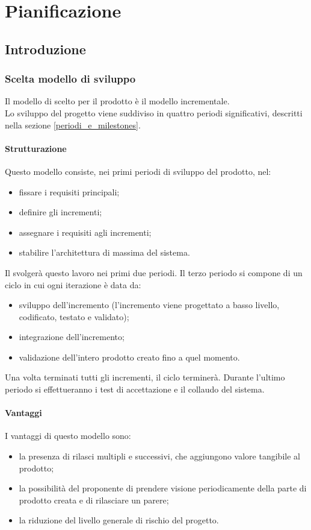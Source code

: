 \section {Pianificazione}
\subsection {Introduzione}
	\subsubsection{Scelta modello di sviluppo}
	Il modello di  scelto per il prodotto è il modello incrementale.\\
	Lo sviluppo del progetto viene suddiviso in quattro periodi significativi, descritti nella sezione \ref{periodi_e_milestones}.
	\paragraph{Strutturazione}
	Questo modello consiste, nei primi periodi di sviluppo del prodotto, nel:
	\begin{itemize}
			\item fissare i requisiti principali;
			\item definire gli incrementi;
			\item assegnare i requisiti agli incrementi;
			\item stabilire l'architettura di massima del sistema.
	\end{itemize}
	Il  svolgerà questo lavoro nei primi due periodi. Il terzo periodo si compone di un ciclo in cui ogni iterazione è data da:
	\begin{itemize}
		\item sviluppo dell'incremento (l'incremento viene progettato a basso livello, codificato, testato e validato);
		\item integrazione dell'incremento;
		\item validazione dell'intero prodotto creato fino a quel momento.
	\end{itemize}
	Una volta terminati tutti gli incrementi, il ciclo terminerà.
	Durante l'ultimo periodo si effettueranno i test di accettazione e il collaudo del sistema.
	
	\paragraph{Vantaggi}
	I vantaggi di questo modello sono:
	\begin{itemize}
		\item la presenza di rilasci multipli e successivi, che aggiungono valore tangibile al prodotto;
		\item la possibilità del proponente di prendere visione periodicamente della parte di prodotto creata e di rilasciare un parere;
		\item la riduzione del livello generale di rischio del progetto.
	\end{itemize}

